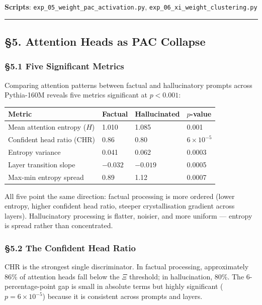 \documentclass[
  11pt,
  a4paper]{article}
\begin{document}
\textbf{Scripts}: \texttt{exp\_05\_weight\_pac\_activation.py},
\texttt{exp\_06\_xi\_weight\_clustering.py}

\begin{center}\rule{0.5\linewidth}{0.5pt}\end{center}

\subsection{§5. Attention Heads as PAC
Collapse}\label{attention-heads-as-pac-collapse}

\subsubsection{§5.1 Five Significant
Metrics}\label{five-significant-metrics}

Comparing attention patterns between factual and hallucinatory prompts
across Pythia-160M reveals five metrics significant at \(p < 0.001\):

\begin{longtable}[]{@{}llll@{}}
\toprule\noalign{}
Metric & Factual & Hallucinated & \(p\)-value \\
\midrule\noalign{}
\endhead
\bottomrule\noalign{}
\endlastfoot
Mean attention entropy (\(H\)) & 1.010 & 1.085 & 0.001 \\
Confident head ratio (CHR) & 0.86 & 0.80 & \(6 \times 10^{-5}\) \\
Entropy variance & 0.041 & 0.062 & 0.0003 \\
Layer transition slope & \(-0.032\) & \(-0.019\) & 0.0005 \\
Max-min entropy spread & 0.89 & 1.12 & 0.0007 \\
\end{longtable}

All five point the same direction: factual processing is more ordered
(lower entropy, higher confident head ratio, steeper crystallisation
gradient across layers). Hallucinatory processing is flatter, noisier,
and more uniform --- entropy is spread rather than concentrated.

\subsubsection{§5.2 The Confident Head
Ratio}\label{the-confident-head-ratio}

CHR is the strongest single discriminator. In factual processing,
approximately 86\% of attention heads fall below the \(\Xi\) threshold;
in hallucination, 80\%. The 6-percentage-point gap is small in absolute
terms but highly significant (\(p = 6 \times 10^{-5}\)) because it is
consistent across prompts and layers.
\end{document}
